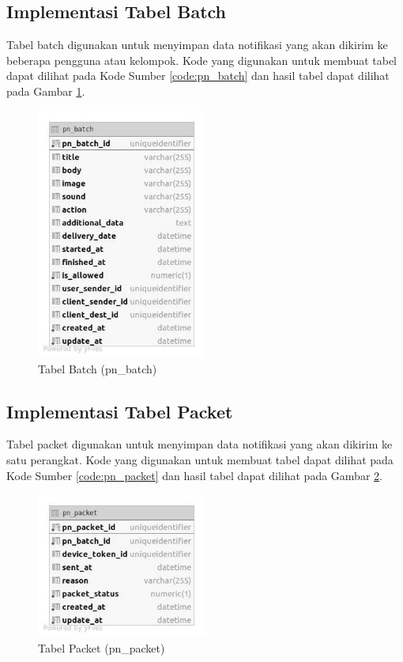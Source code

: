\subsection{Implementasi Tabel Batch}
\par Tabel batch digunakan untuk menyimpan data notifikasi yang akan dikirim ke beberapa pengguna atau kelompok. Kode yang digunakan untuk membuat tabel dapat dilihat pada Kode Sumber \ref{code:pn_batch} dan hasil tabel dapat dilihat pada Gambar \ref{tabel_pn_batch}.

\begin{figure}[H]
    \centering\includegraphics[width=0.5\textwidth]{bab4/figures/tabel_pn_batch.jpg}
    \caption{Tabel Batch (pn\_batch)}
    \label{tabel_pn_batch}
\end{figure}

\subsection{Implementasi Tabel Packet}
\par Tabel packet digunakan untuk menyimpan data notifikasi yang akan dikirim ke satu perangkat. Kode yang digunakan untuk membuat tabel dapat dilihat pada Kode Sumber \ref{code:pn_packet} dan hasil tabel dapat dilihat pada Gambar \ref{tabel_pn_packet}.

\begin{figure}[H]
    \centering\includegraphics[width=0.5\textwidth]{bab4/figures/tabel_pn_packet.jpg}
    \caption{Tabel Packet (pn\_packet)}
    \label{tabel_pn_packet}
\end{figure}

